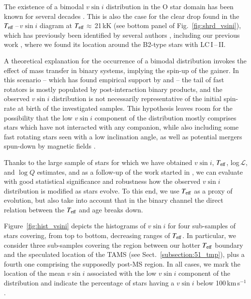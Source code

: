 \documentclass{aa}
\newcommand{\vsini}{\mbox{$v\sin i$}\xspace}
\newcommand{\Teff}{\mbox{$T_{\rm eff}$}\xspace}
\newcommand{\logQ}{\mbox{$\log Q$}\xspace}
\newcommand{\Ls}{$ \mathcal{L}$\xspace}
\newcommand{\kms}{\,\mbox{km\,s$^{-1}$}\xspace}
\begin{document}
The existence of a bimodal \vsini distribution in the O star domain has been known for several decades \citep[see, e.g.,][]{conti77}. This is also the case for the clear drop found in the \Teff\,--\,\vsini diagram at \Teff$\approx$\,21\,kK (see bottom panel of Fig.~\ref{fig:shrd_vsini}), which has previously been identified by several authors \citep[see, e.g.,][]{howarth97, vink10, fraser10, brott11}, including our previous work \citep{deburgos23}, where we found its location around the B2-type stars with LC\,I\,--\,II.

A theoretical explanation for the occurrence of a bimodal distribution \citep[proposed by][]{demink13} invokes the effect of mass transfer in binary systems, implying the spin-up of the gainer. In this scenario -- which has found empirical support by \citet{holgado22} and \citet{britavskiy23} -- the tail of fast rotators is mostly populated by post-interaction binary products, and the observed \vsini distribution is not necessarily representative of the initial spin-rate at birth of the investigated samples. This hypothesis leaves room for the possibility that the low \vsini component of the distribution mostly comprises stars which have not interacted with any companion, while also including some fast rotating stars seen with a low inclination angle, as well as potential mergers spun-down by magnetic fields \citep[see, e.g.,][]{schneider16, keszthelyi19}.

Thanks to the large sample of stars for which we have obtained \vsini, \Teff, log\,\Ls, and \logQ estimates, and as a follow-up of the work started in \cite{holgado22}, we can evaluate with good statistical significance and robustness how the observed \vsini distribution is modified as stars evolve. To this end, we use \Teff as a proxy of evolution, but also take into account that in the binary channel the direct relation between the \Teff and age breaks down.

Figure~\ref{fig:hist_vsini} depicts the histograms of \vsini for four sub-samples of stars covering, from top to bottom, decreasing ranges of \Teff. In particular, we consider three sub-samples covering the region between our hotter \Teff boundary and the speculated location of the TAMS (see Sect.~\ref{subsection:51_tmp}), plus a fourth one comprising the supposedly post-MS region. In all cases, we mark the location of the mean \vsini associated with the low \vsini component of the distribution and indicate the percentage of stars having a \vsini below 100\kms.
\end{document}
